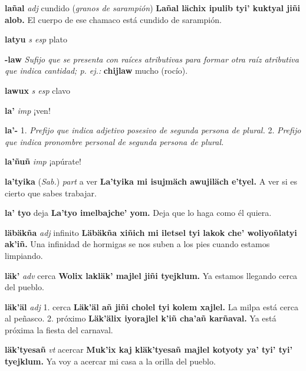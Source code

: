 \documentclass[10pt]{scrbook}
\newcommand{\entry}[1]{\textbf{#1}}
\newcommand{\onedefinition}[1]{#1.}
\newcommand{\nontranslationdef}[1]{\textit{#1}}
\newcommand{\partofspeech}[1]{\textit{#1}}
\newcommand{\spanishtranslation}[1]{#1}
\newcommand{\clarification}[1]{(\textit{#1})}
\newcommand{\cholexample}[1]{\textbf{#1}}
\newcommand{\exampletranslation}[1]{#1}
\newcommand{\relevantdialect}[1]{(\textit{#1})}
\begin{document}
\begin{multicols}{2}
\entry{lañal}
\partofspeech{adj}
\spanishtranslation{cundido}
\clarification{granos de sarampión}
\cholexample{Lañal lächix ipulib tyi' kuktyal jiñi alob.}
\exampletranslation{El cuerpo de ese chamaco está cundido de sarampión.}

\entry{latyu}
\partofspeech{s esp}
\spanishtranslation{plato}

\entry{-law}
\nontranslationdef{Sufijo que se presenta con raíces atributivas para formar otra raíz atributiva que indica cantidad; p. ej.:}
\cholexample{chijlaw}
\exampletranslation{mucho (rocío).}

\entry{lawux}
\partofspeech{s esp}
\spanishtranslation{clavo}

\entry{la'}
\partofspeech{imp}
\spanishtranslation{¡ven!}

\entry{la'-}
\onedefinition{1}
\nontranslationdef{Prefijo que indica adjetivo posesivo de segunda persona de plural.}
\onedefinition{2}
\nontranslationdef{Prefijo que indica pronombre personal de segunda persona de plural.}

\entry{la'ñuñ}
\partofspeech{imp}
\spanishtranslation{¡apúrate!}

\entry{la'tyika}
\relevantdialect{Sab.}
\partofspeech{part}
\spanishtranslation{a ver}
\cholexample{La'tyika mi isujmäch awujiläch e'tyel.}
\exampletranslation{A ver si es cierto que sabes trabajar.}

\entry{la' tyo}
\spanishtranslation{deja}
\cholexample{La'tyo imelbajche' yom.}
\exampletranslation{Deja que lo haga como él quiera.}

\entry{läbäkña}
\partofspeech{adj}
\spanishtranslation{infinito}
\cholexample{Läbäkña xiñich mi iletsel tyi lakok che' woliyoñlatyi ak'iñ.}
\exampletranslation{Una infinidad de hormigas se nos suben a los pies cuando estamos limpiando.}

\entry{läk'}
\partofspeech{adv}
\spanishtranslation{cerca}
\cholexample{Wolix lakläk' majlel jiñi tyejklum.}
\exampletranslation{Ya estamos llegando cerca del pueblo.}

\entry{läk'äl}
\partofspeech{adj}
\onedefinition{1}
\spanishtranslation{cerca}
\cholexample{Läk'äl añ jiñi cholel tyi kolem xajlel.}
\exampletranslation{La milpa está cerca al peñasco.}
\onedefinition{2}
\spanishtranslation{próximo}
\cholexample{Läk'älix iyorajlel k'iñ cha'añ karñaval.}
\exampletranslation{Ya está próxima la fiesta del carnaval.}

\entry{läk'tyesañ}
\partofspeech{vt}
\spanishtranslation{acercar}
\cholexample{Muk'ix kaj kläk'tyesañ majlel kotyoty ya' tyi' tyi' tyejklum.}
\exampletranslation{Ya voy a acercar mi casa a la orilla del pueblo.}


\end{multicols}
\end{document}
